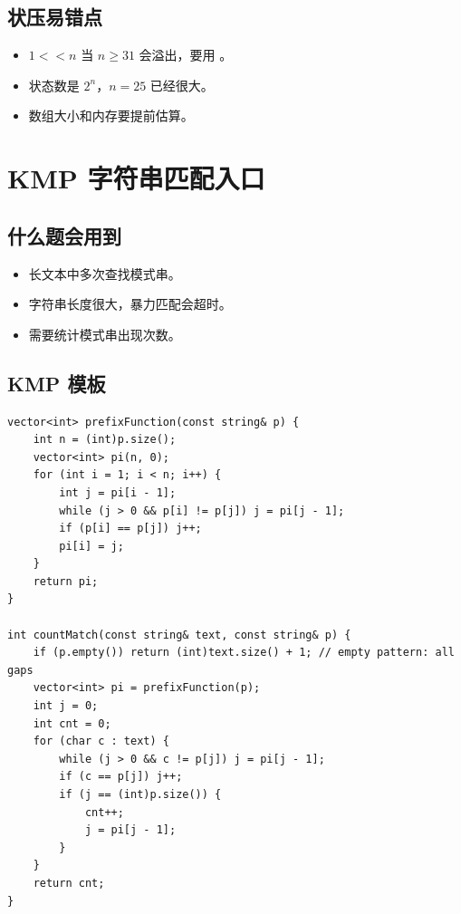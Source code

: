\subsection{状压易错点}

\begin{itemize}
  \item $1 << n$ 当 $n \ge 31$ 会溢出，要用 。
  \item 状态数是 $2^n$，$n=25$ 已经很大。
  \item 数组大小和内存要提前估算。
\end{itemize}

\section{KMP 字符串匹配入口}\label{sec:08-13}

\subsection{什么题会用到}

\begin{itemize}
  \item 长文本中多次查找模式串。
  \item 字符串长度很大，暴力匹配会超时。
  \item 需要统计模式串出现次数。
\end{itemize}

\subsection{KMP 模板}

\begin{lstlisting}
vector<int> prefixFunction(const string& p) {
    int n = (int)p.size();
    vector<int> pi(n, 0);
    for (int i = 1; i < n; i++) {
        int j = pi[i - 1];
        while (j > 0 && p[i] != p[j]) j = pi[j - 1];
        if (p[i] == p[j]) j++;
        pi[i] = j;
    }
    return pi;
}

int countMatch(const string& text, const string& p) {
    if (p.empty()) return (int)text.size() + 1; // empty pattern: all gaps
    vector<int> pi = prefixFunction(p);
    int j = 0;
    int cnt = 0;
    for (char c : text) {
        while (j > 0 && c != p[j]) j = pi[j - 1];
        if (c == p[j]) j++;
        if (j == (int)p.size()) {
            cnt++;
            j = pi[j - 1];
        }
    }
    return cnt;
}
\end{lstlisting}

